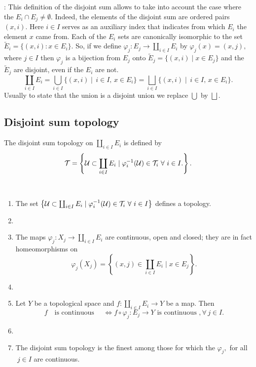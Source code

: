 : This definition of the disjoint sum allows to take into account the case where the $E_{i}\cap E_{j}\ne \emptyset$. Indeed, the elements of the disjoint sum are ordered pairs $ (x,i)$. Here $i\in I$ serves as an auxiliary index that indicates from which $E_i$ the element $x$ came from.  
Each of the $E_i$ sets  are canonically isomorphic to the set $\tilde E_i=\{(x,i): x\in E_i\}$. 
So, if we define $\varphi_j:E_j \to \coprod_{i\in I}E_i$ by $\varphi_j(x)=(x,j), $ where $j\in I$ then $ \varphi_{j}$ is a bijection from $E_j$ onto $\tilde E_j=\{(x,i)\mid x\in E_j\}$ and the $\tilde E_j$ are  disjoint, even if the $E_i$ are not.  
\[
\coprod_{i\in I}E_{i}=\bigcup_{i\in I} \{(x,i) \mid\, i\in I, \,x\in E_{i}\}=\bigsqcup_{i\in I} \{(x,i) \mid\, i\in I, \,x\in E_{i}\}.
\] 
Usually to state that the union is a disjoint union we replace $\bigcup$ by $ \bigsqcup$.

\subsection{Disjoint sum topology}%

 \begin{definition} The disjoint sum topology on $\coprod_{i\in I}E_{i}$ is defined by 
 \[
 \cT= \left\{\cU\subset \coprod_{i\in I}E_{i} \mid \varphi_{i}^{-1}(\cU)\in \cT_{i} \ \forall \ i\in I. \right\}.
 \]
  \end{definition} 

\begin{proposition} 

\,

\begin{enumerate}
 \item The set $ \left\{\cU\subset \coprod_{i\in I}E_{i} \mid \varphi_{i}^{-1}(\cU)\in \mathcal{T}_{i} \ \forall \ i\in I \right\}$ defines a topology.

\item[]

\item The maps $\varphi_{j}: X_{j}\to \coprod_{i\in I}E_{i}$ are continuous, open and closed; they are in fact homeomorphisms on
\[\varphi_{j}(X_{j})=\left\{(x,j)\in \coprod_{i\in I}E_{i}\mid x\in E_{j}\right\}.\]

\item[]
\item Let $Y$ be a topological space and $f: \coprod_{i\in I}E_{i}\to Y$ be a map. Then
\[ f\quad \text{is continuous }\quad  \Leftrightarrow f\circ \varphi_{j}:E_{j}\to Y \text{ is continuous }, \forall\, j\in I.\]

\item[]
\item The disjoint sum topology is the finest among those for which the $\varphi_{j},$ for all $\ j\in I$ are continuous.
\end{enumerate}
\end{proposition}


